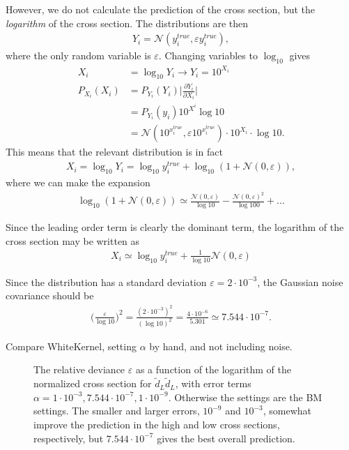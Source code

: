 \documentclass[twoside,english]{uiofysmaster}
\begin{document}
However, we do not calculate the prediction of the cross section, but the \textit{logarithm} of the cross section. The distributions are then
\begin{align}
Y_i = \mathcal{N}(y_i^{true}, \varepsilon y_i^{true}),
\end{align}
where the only random variable is $\varepsilon$. Changing variables to $\log_{10}$ gives
\begin{align}
X_i &= \log_{10} Y_i \rightarrow Y_i = 10^{X_i}\\
P_{X_i} (X_i) &= P_{Y_i} (Y_i) \Big|\frac{\partial Y_i}{\partial X_i}\Big|\\
&= P_{Y_i} (y_i) 10^{X^i} \log 10\\
&= \mathcal{N} (10^{x_i^{true}}, \varepsilon 10^{x_i^{true}}) \cdot 10^{X_i} \cdot \log 10.
\end{align}
This means that the relevant distribution is in fact
\begin{align*}
X_i = \log_{10} Y_i = \log_{10} y_i^{true} + \log_{10} (1 + \mathcal{N}(0, \varepsilon)),
\end{align*}
where we can make the expansion
\begin{align}
\log_{10} (1 + \mathcal{N}(0, \varepsilon)) \simeq \frac{\mathcal{N} (0, \varepsilon)}{\log 10} - \frac{\mathcal{N} (0, \varepsilon)^2}{\log 100} +...
\end{align}

Since the leading order term is clearly the dominant term, the logarithm of the cross section may be written as
\begin{align}\label{Eq:: cross section log gaussian noise}
X_i \simeq \log_{10} y_i^{true} + \frac{1}{\log 10} \mathcal{N} (0, \varepsilon)
\end{align}

Since the distribution has a standard deviation $\varepsilon = 2 \cdot 10^{-3}$, the Gaussian noise covariance should be
\begin{align*}
\Big( \frac{\varepsilon}{\log 10} \Big)^2 = \frac{(2 \cdot 10^{-3})^2}{(\log 10)^2} = \frac{4 \cdot 10^{-6}}{5.301} \simeq 7.544 \cdot 10^{-7}.
\end{align*}

Compare WhiteKernel, setting $\alpha$ by hand, and not including noise.

\begin{figure}[H]
\caption{The relative deviance $\varepsilon$ as a function of the logarithm of the normalized cross section for $\tilde{d}_L \tilde{d}_L$, with error terms $\alpha = 1 \cdot 10^{-3}, 7.544 \cdot 10^{-7}, 1 \cdot 10^{-9}$. Otherwise the settings are the BM settings. The smaller and larger errors, $10^{-9}$ and $10^{-3}$, somewhat improve the prediction in the high and low cross sections, respectively, but $7.544 \cdot 10^{-7}$ gives the best overall prediction.}
\end{figure}
\end{document}
